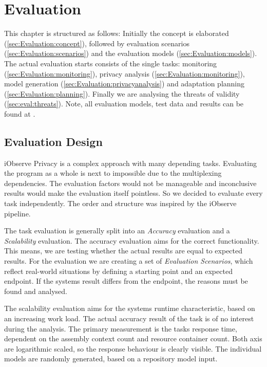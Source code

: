 
\chapter{Evaluation}
\label{ch:Evaluation}

This chapter is structured as follows: Initially the concept is elaborated (\autoref{sec:Evaluation:concept}), followed by evaluation scenarios (\autoref{sec:Evaluation:scenarios}) and the evaluation models (\autoref{sec:Evaluation:models}). The actual evaluation starts consists of the single tasks: monitoring (\autoref{sec:Evaluation:monitoring}), privacy analysis (\autoref{sec:Evaluation:monitoring}), model generation (\autoref{sec:Evaluation:privacyanalysis}) and  adaptation planning (\autoref{sec:Evaluation:planning}). Finally we are analysing the threats of validity (\autoref{sec:eval:threats}). Note, all evaluation models, test data and results can be found at \cite{privacy.PW}.

\section{Evaluation Design}
\label{sec:Evaluation:concept}

iObserve Privacy is a complex approach with many depending tasks. Evaluating the program as a whole is next to impossible due to the multiplexing dependencies. The evaluation factors would not be manageable and inconclusive results would make the evaluation itself pointless. So we decided to evaluate every task independently. The order and structure was inspired by the iObserve pipeline.

The task evaluation is generally split into an \textit{Accuracy} evaluation and a \textit{Scalability} evaluation. The accuracy evaluation aims for the correct functionality. This means, we are testing whether the actual results are equal to expected results. For the evaluation we are creating a set of \textit{Evaluation Scenarios}, which reflect real-world situations by defining a starting point and an expected endpoint. If the systems result differs from the endpoint, the reasons must be found and analysed.

The scalability evaluation aims for the systems runtime characteristic, based on an increasing work load. The actual accuracy result of the task is of no interest during the analysis. The primary measurement is the tasks response time, dependent on the assembly context count and resource container count. Both axis are logarithmic scaled, so the response behaviour is clearly visible. The individual models are randomly generated, based on a repository model input.

